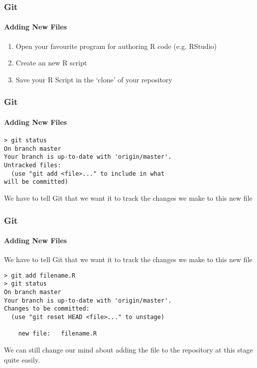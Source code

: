 \documentclass[xcolor=dvipsnames]{beamer}
\begin{document}
\begin{frame}[fragile]
\frametitle{Git}
\framesubtitle{Adding New Files}
\begin{enumerate}
\item Open your favourite program for authoring R code (e.g. RStudio)
\item Create an new R script 
\item Save your R Script in the `clone' of your repository
\end{enumerate}

\end{frame}

\begin{frame}[fragile]
\frametitle{Git}
\framesubtitle{Adding New Files}

\begin{block}{}
\begin{lstlisting}
> git status
On branch master
Your branch is up-to-date with 'origin/master'.
Untracked files:
  (use "git add <file>..." to include in what 
will be committed)
\end{lstlisting}
\end{block}

We have to tell Git that we want it to track the changes we make to this new file

\end{frame}

\begin{frame}[fragile]
\frametitle{Git}
\framesubtitle{Adding New Files}

We have to tell Git that we want it to track the changes we make to this new file
\begin{block}{}
\begin{lstlisting}
> git add filename.R
> git status
On branch master
Your branch is up-to-date with 'origin/master'.
Changes to be committed:
  (use "git reset HEAD <file>..." to unstage)

	new file:   filename.R
\end{lstlisting}
\end{block}
We can still change our mind about adding the file to the repository at this stage quite easily.

\end{frame}
\end{document}
